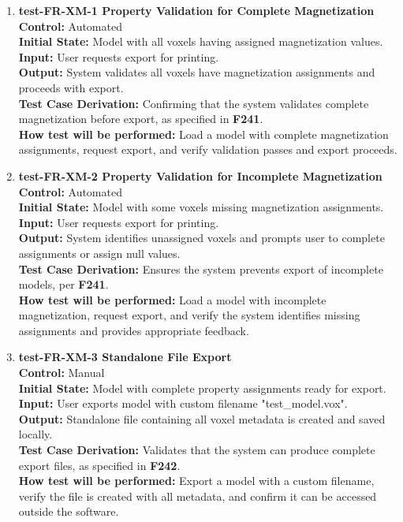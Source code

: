 \documentclass[12pt, titlepage]{article}
\begin{document}
\begin{enumerate}
  \item \textbf{test-FR-XM-1 Property Validation for Complete Magnetization} \\[2mm]
    \textbf{Control:} Automated \\ 
    \textbf{Initial State:} Model with all voxels having assigned magnetization values. \\ 
    \textbf{Input:} User requests export for printing. \\ 
    \textbf{Output:} System validates all voxels have magnetization assignments and proceeds with export. \\[2mm]
    \textbf{Test Case Derivation:} Confirming that the system validates complete magnetization before export, as specified in \textbf{F241}. \\[2mm]
    \textbf{How test will be performed:} Load a model with complete magnetization assignments, request export, and verify validation passes and export proceeds.

  \item \textbf{test-FR-XM-2 Property Validation for Incomplete Magnetization} \\[2mm]
    \textbf{Control:} Automated \\ 
    \textbf{Initial State:} Model with some voxels missing magnetization assignments. \\ 
    \textbf{Input:} User requests export for printing. \\ 
    \textbf{Output:} System identifies unassigned voxels and prompts user to complete assignments or assign null values. \\[2mm]
    \textbf{Test Case Derivation:} Ensures the system prevents export of incomplete models, per \textbf{F241}. \\[2mm]
    \textbf{How test will be performed:} Load a model with incomplete magnetization, request export, and verify the system identifies missing assignments and provides appropriate feedback.

  \item \textbf{test-FR-XM-3 Standalone File Export} \\[2mm]
    \textbf{Control:} Manual \\ 
    \textbf{Initial State:} Model with complete property assignments ready for export. \\ 
    \textbf{Input:} User exports model with custom filename "test\_model.vox". \\ 
    \textbf{Output:} Standalone file containing all voxel metadata is created and saved locally. \\[2mm]
    \textbf{Test Case Derivation:} Validates that the system can produce complete export files, as specified in \textbf{F242}. \\[2mm]
    \textbf{How test will be performed:} Export a model with a custom filename, verify the file is created with all metadata, and confirm it can be accessed outside the software.


\end{enumerate}
\end{document}
